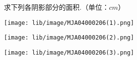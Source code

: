 求下列各阴影部分的面积.（单位：$cm$）

\begin{subquestions}
\subquestion 
    \texttt{[image: lib/image/MJA04000206(1).png]}

\subquestion 
    \texttt{[image: lib/image/MJA04000206(2).png]}


\subquestion 
    \texttt{[image: lib/image/MJA04000206(3).png]}
\end{subquestions}